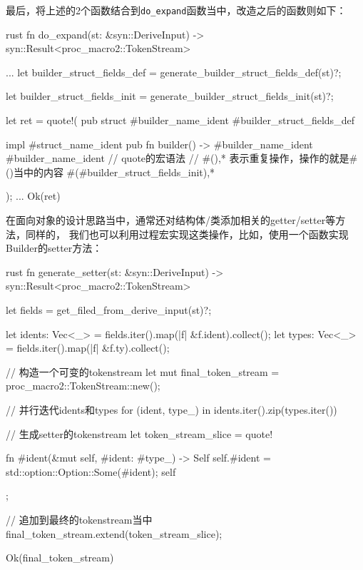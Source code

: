 最后，将上述的2个函数结合到\texttt{do_expand}函数当中，改造之后的函数则如下：
\begin{code-block}{rust}
fn do_expand(st: &syn::DeriveInput) -> syn::Result<proc_macro2::TokenStream> {
    ...
    let builder_struct_fields_def = generate_builder_struct_fields_def(st)?;

    let builder_struct_fields_init = generate_builder_struct_fields_init(st)?;

    let ret = quote!(
        pub struct #builder_name_ident {
            #builder_struct_fields_def
        }

        impl #struct_name_ident {
            pub fn builder() -> #builder_name_ident {
                #builder_name_ident {
                    // quote的宏语法
                    // #(),* 表示重复操作，操作的就是#()当中的内容
                    #(#builder_struct_fields_init),*
                }
            }
        }

    );
    ...
    Ok(ret)
}
\end{code-block}

在面向对象的设计思路当中，通常还对结构体/类添加相关的getter/setter等方法，同样的，
我们也可以利用过程宏实现这类操作，比如，使用一个函数实现Builder的setter方法：
\begin{code-block}{rust}
fn generate_setter(st: &syn::DeriveInput) -> syn::Result<proc_macro2::TokenStream> {
    let fields = get_filed_from_derive_input(st)?;

    let idents: Vec<_> = fields.iter().map(|f| &f.ident).collect();
    let types: Vec<_> = fields.iter().map(|f| &f.ty).collect();

    // 构造一个可变的tokenstream
    let mut final_token_stream = proc_macro2::TokenStream::new();

    // 并行迭代idents和types
    for (ident, type_) in idents.iter().zip(types.iter()) {
        // 生成setter的tokenstream
        let token_stream_slice = quote! {

            fn #ident(&mut self, #ident: #type_) -> Self {
                self.#ident = std::option::Option::Some(#ident);
                self
            }

        };

        // 追加到最终的tokenstream当中
        final_token_stream.extend(token_stream_slice);
    }
    Ok(final_token_stream)
}
\end{code-block}

